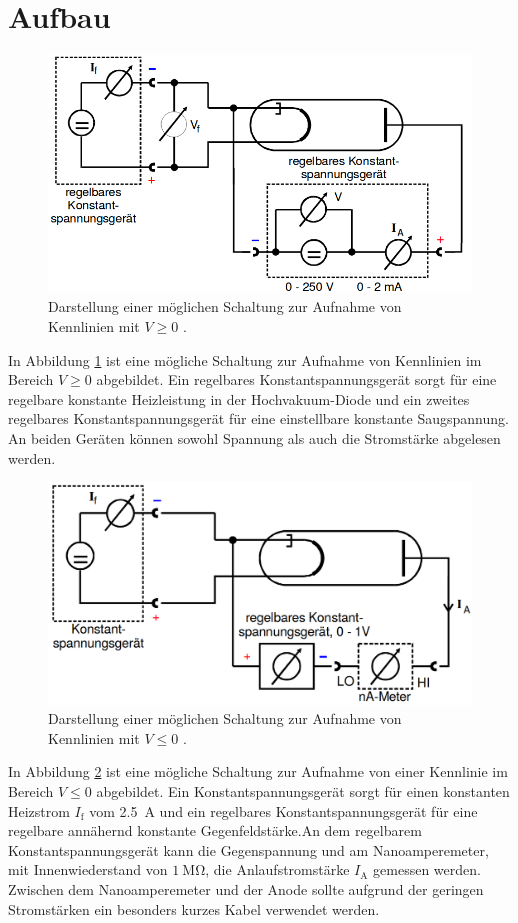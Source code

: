 \section{Aufbau}
\label{sec:Aufbau}
\begin{figure}
	\centering
	\includegraphics[width=\linewidth-100pt,height=\textheight-100pt,keepaspectratio]{content/Bilder/Schaltung1.png}
	\caption{Darstellung einer möglichen Schaltung zur Aufnahme von Kennlinien mit $V\ge0$ \cite{V504}.}
	\label{fig:Schaltung1}
\end{figure}
In Abbildung \ref{fig:Schaltung1} ist eine mögliche Schaltung zur Aufnahme von Kennlinien im Bereich $V\ge 0$ abgebildet. Ein regelbares Konstantspannungsgerät sorgt für eine regelbare konstante Heizleistung in der Hochvakuum-Diode und ein zweites regelbares Konstantspannungsgerät für eine einstellbare konstante Saugspannung. An beiden Geräten können sowohl Spannung als auch die Stromstärke abgelesen werden.
\begin{figure}
	\centering
	\includegraphics[width=\linewidth-100pt,height=\textheight-100pt,keepaspectratio]{content/Bilder/Schaltung2.png}
	\caption{Darstellung einer möglichen Schaltung zur Aufnahme von Kennlinien mit $V\le0$ \cite{V504}.}
	\label{fig:Schaltung2}
\end{figure}
In Abbildung \ref{fig:Schaltung2} ist eine mögliche Schaltung zur Aufnahme von einer Kennlinie im Bereich $V\le0$ abgebildet. Ein Konstantspannungsgerät sorgt für einen konstanten Heizstrom $I_\text{f}$ vom \SI{2.5}{\ampere} und ein regelbares Konstantspannungsgerät für eine regelbare annähernd konstante Gegenfeldstärke.An dem regelbarem Konstantspannungsgerät kann die Gegenspannung und am Nanoamperemeter, mit Innenwiederstand von $\SI{1}{\mega\ohm}$, die Anlaufstromstärke $I_\text{A}$ gemessen werden. Zwischen dem Nanoamperemeter und der Anode sollte aufgrund der geringen Stromstärken ein besonders kurzes Kabel verwendet werden.

